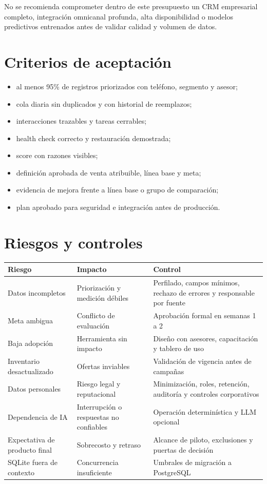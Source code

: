 \documentclass[11pt,a4paper]{article}
\begin{document}
No se recomienda comprometer dentro de este presupuesto un CRM empresarial
completo, integración omnicanal profunda, alta disponibilidad o modelos
predictivos entrenados antes de validar calidad y volumen de datos.

\section{Criterios de aceptación}

\begin{itemize}
  \item al menos 95\% de registros priorizados con teléfono, segmento y asesor;
  \item cola diaria sin duplicados y con historial de reemplazos;
  \item interacciones trazables y tareas cerrables;
  \item health check correcto y restauración demostrada;
  \item score con razones visibles;
  \item definición aprobada de venta atribuible, línea base y meta;
  \item evidencia de mejora frente a línea base o grupo de comparación;
  \item plan aprobado para seguridad e integración antes de producción.
\end{itemize}

\section{Riesgos y controles}

\begin{longtable}{p{3.8cm}p{5cm}p{5.8cm}}
\toprule
\textbf{Riesgo} & \textbf{Impacto} & \textbf{Control}\\
\midrule
\endhead
Datos incompletos & Priorización y medición débiles & Perfilado, campos mínimos,
rechazo de errores y responsable por fuente\\
Meta ambigua & Conflicto de evaluación & Aprobación formal en semanas 1 a 2\\
Baja adopción & Herramienta sin impacto & Diseño con asesores, capacitación y
tablero de uso\\
Inventario desactualizado & Ofertas inviables & Validación de vigencia antes de
campañas\\
Datos personales & Riesgo legal y reputacional & Minimización, roles, retención,
auditoría y controles corporativos\\
Dependencia de IA & Interrupción o respuestas no confiables & Operación
determinística y LLM opcional\\
Expectativa de producto final & Sobrecosto y retraso & Alcance de piloto,
exclusiones y puertas de decisión\\
SQLite fuera de contexto & Concurrencia insuficiente & Umbrales de migración a
PostgreSQL\\
\bottomrule
\end{longtable}
\end{document}
